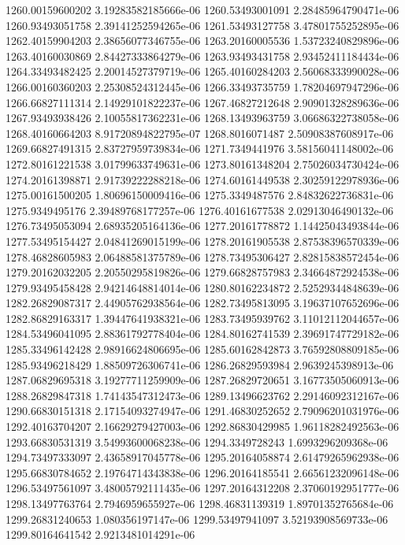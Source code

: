 {1260.00159600202 3.19283582185666e-06
1260.53493001091 2.28485964790471e-06
1260.93493051758 2.39141252594265e-06
1261.53493127758 3.47801755252895e-06
1262.40159904203 2.38656077346755e-06
1263.20160005536 1.53723240829896e-06
1263.40160030869 2.84427333864279e-06
1263.93493431758 2.93452411184434e-06
1264.33493482425 2.20014527379719e-06
1265.40160284203 2.56068333990028e-06
1266.00160360203 2.25308524312445e-06
1266.33493735759 1.78204697947296e-06
1266.66827111314 2.14929101822237e-06
1267.46827212648 2.90901328289636e-06
1267.93493938426 2.10055817362231e-06
1268.13493963759 3.06686322738058e-06
1268.40160664203 8.91720894822795e-07
1268.8016071487 2.50908387608917e-06
1269.66827491315 2.83727959739834e-06
1271.7349441976 3.58156041148002e-06
1272.80161221538 3.01799633749631e-06
1273.80161348204 2.75026034730424e-06
1274.20161398871 2.91739222288218e-06
1274.60161449538 2.30259122978936e-06
1275.00161500205 1.80696150009416e-06
1275.3349487576 2.84832622736831e-06
1275.9349495176 2.39489768177257e-06
1276.40161677538 2.02913046490132e-06
1276.73495053094 2.68935205164136e-06
1277.20161778872 1.14425043493844e-06
1277.53495154427 2.04841269015199e-06
1278.20161905538 2.87538396570339e-06
1278.46828605983 2.06488581375789e-06
1278.73495306427 2.82815838572454e-06
1279.20162032205 2.20550295819826e-06
1279.66828757983 2.34664872924538e-06
1279.93495458428 2.94214648814014e-06
1280.80162234872 2.52529344848639e-06
1282.26829087317 2.44905762938564e-06
1282.73495813095 3.19637107652696e-06
1282.86829163317 1.39447641938321e-06
1283.73495939762 3.11012112044657e-06
1284.53496041095 2.88361792778404e-06
1284.80162741539 2.39691747729182e-06
1285.33496142428 2.98916624806695e-06
1285.60162842873 3.76592808809185e-06
1285.93496218429 1.88509726306741e-06
1286.26829593984 2.9639245398913e-06
1287.06829695318 3.19277711259909e-06
1287.26829720651 3.16773505060913e-06
1288.26829847318 1.74143547312473e-06
1289.13496623762 2.29146092312167e-06
1290.66830151318 2.17154093274947e-06
1291.46830252652 2.79096201031976e-06
1292.40163704207 2.16629279427003e-06
1292.86830429985 1.96118282492563e-06
1293.66830531319 3.54993600068238e-06
1294.3349728243 1.6993296209368e-06
1294.73497333097 2.43658917045778e-06
1295.20164058874 2.61479265962938e-06
1295.66830784652 2.19764714343838e-06
1296.20164185541 2.66561232096148e-06
1296.53497561097 3.48005792111435e-06
1297.20164312208 2.37060192951777e-06
1298.13497763764 2.7946959655927e-06
1298.46831139319 1.89701352765684e-06
1299.26831240653 1.080356197147e-06
1299.53497941097 3.52193908569733e-06
1299.80164641542 2.9213481014291e-06
}
